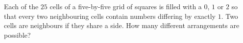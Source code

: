 Each of the $25$ cells of a five-by-five grid of squares is filled with a $0$, $1$ or $2$ so that every two neighbouring cells contain numbers differing by exactly $1$. Two cells are neighbours if they share a side. How many different arrangements are possible?
